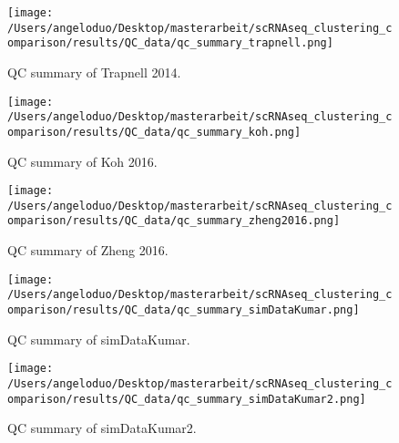 \documentclass[12pt, a4paper]{article}\usepackage[]{graphicx}\usepackage[]{color}
\begin{document}
\begin{figure}[!h]
\texttt{[image: /Users/angeloduo/Desktop/masterarbeit/scRNAseq\_clustering\_comparison/results/QC\_data/qc\_summary\_trapnell.png]}
\caption{QC summary of Trapnell 2014. }
\label{fig:qctrapnell}
\end{figure}

\begin{figure}[!h]
\texttt{[image: /Users/angeloduo/Desktop/masterarbeit/scRNAseq\_clustering\_comparison/results/QC\_data/qc\_summary\_koh.png]}
\caption{QC summary of Koh 2016. }
\label{fig:qckoh}
\end{figure}

\begin{figure}[!h]
\texttt{[image: /Users/angeloduo/Desktop/masterarbeit/scRNAseq\_clustering\_comparison/results/QC\_data/qc\_summary\_zheng2016.png]}
\caption{QC summary of Zheng 2016. }
\label{fig:qczheng}
\end{figure}

\begin{figure}[!h]
\texttt{[image: /Users/angeloduo/Desktop/masterarbeit/scRNAseq\_clustering\_comparison/results/QC\_data/qc\_summary\_simDataKumar.png]}
\caption{QC summary of simDataKumar. }
\label{fig:simDataKumar}
\end{figure}



\begin{figure}[!h]
\texttt{[image: /Users/angeloduo/Desktop/masterarbeit/scRNAseq\_clustering\_comparison/results/QC\_data/qc\_summary\_simDataKumar2.png]}
\caption{QC summary of simDataKumar2. }
\label{fig:simDataKumar}
\end{figure}
\clearpage
\end{document}
